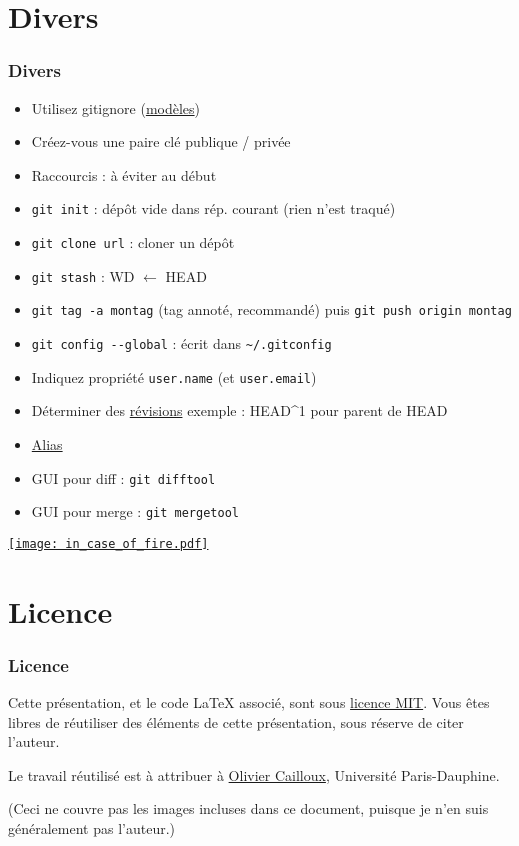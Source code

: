 \documentclass[english, french]{beamer}
\begin{document}
\section{Divers}
\begin{frame}
	\frametitle{Divers}
	\vspace{-1pt}
	\begin{itemize}
		\item Utilisez gitignore {\tiny (\href{https://github.com/github/gitignore}{modèles})}
		\item Créez-vous une paire clé publique / privée
		\item Raccourcis : à éviter au début
		\item \texttt{git init} : dépôt vide dans rép. courant (rien n’est traqué)
		\item \texttt{git clone url} : cloner un dépôt
		\item \texttt{git stash} : WD $←$ HEAD
		\item \texttt{git tag -a montag} {\tiny (tag annoté, recommandé)} puis \texttt{git push origin montag}
		\item \texttt{git config -{}-global} : écrit dans \texttt{\textasciitilde/.gitconfig}
		\item Indiquez propriété \texttt{user.name} (et \texttt{user.email})
		\item Déterminer des \href{https://git-scm.com/book/en/v2/Git-Tools-Revision-Selection}{révisions} {\tiny exemple : HEAD\textasciicircum 1 pour parent de HEAD}
		\item \href{https://git-scm.com/book/en/v2/Git-Basics-Git-Aliases}{Alias}
		\item GUI pour diff : \texttt{git difftool}
		\item GUI pour merge : \texttt{git mergetool}
	\end{itemize}
\end{frame}

\begin{frame}
	\href{https://github.com/louim/in-case-of-fire}{\texttt{[image: in\_case\_of\_fire.pdf]}}
\end{frame}

\appendix
\AtBeginSection{
}

\section{Licence}
\begin{frame}
	\frametitle{Licence}
	Cette présentation, et le code LaTeX associé, sont sous \href{https://opensource.org/licenses/MIT}{licence MIT}. Vous êtes libres de réutiliser des éléments de cette présentation, sous réserve de citer l’auteur.
	
	Le travail réutilisé est à attribuer à \href{https://www.lamsade.dauphine.fr/~ocailloux/}{Olivier Cailloux}, Université Paris-Dauphine.
	
	\small{(Ceci ne couvre pas les images incluses dans ce document, puisque je n’en suis généralement pas l’auteur.)}
\end{frame}
\end{document}
